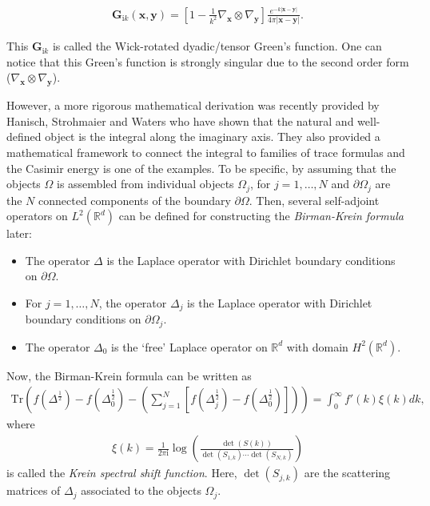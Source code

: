 \begin{align*}
    \boldsymbol{G}_{\mathrm{i}k}(\boldsymbol{x}, \boldsymbol{y}) = \left[1 - \frac{1}{k^{2}}\nabla_{\boldsymbol{x}}\otimes\nabla_{\boldsymbol{y}}\right]\frac{e^{-k|\boldsymbol{x} - \boldsymbol{y}|}}{4\pi|\boldsymbol{x} - \boldsymbol{y}|}.
\end{align*}

This $ \boldsymbol{G}_{\mathrm{i}k}$ is called the Wick-rotated dyadic/tensor Green's function. One can notice that this Green's function is strongly singular 
due to the second order form ($\nabla_{\boldsymbol{x}}\otimes\nabla_{\boldsymbol{y}}$). 



However, a more rigorous mathematical 
derivation was recently provided by Hanisch, Strohmaier and Waters \cite{hanisch2020relative} who have shown that the natural and well-defined object is the 
integral along the imaginary axis. They also provided a mathematical framework to connect the integral to families of trace formulas and the Casimir 
energy is one of the examples. To be specific, by assuming that the objects $\Omega$ is assembled from individual objects $\Omega_{j}$, for $j = 1, \dots, N$ and 
$\partial\Omega_{j}$ are the $N$ connected components of the boundary $\partial\Omega$. Then, several self-adjoint operators on $L^{2}(\mathbb{R}^{d})$
can be defined for constructing the \emph{Birman-Krein formula} later:
\begin{itemize}
    \item The operator $\Delta$ is the Laplace operator with Dirichlet boundary conditions on $\partial\Omega$.
    \item For $j = 1, \dots, N$, the operator $\Delta_{j}$ is the Laplace operator with Dirichlet boundary conditions on $\partial\Omega_{j}$.
    \item The operator $\Delta_{0}$ is the `free' Laplace operator on $\mathbb{R}^{d}$ with domain $H^{2}(\mathbb{R}^{d})$.
\end{itemize}

Now, the Birman-Krein formula can be written as 
\begin{align}\label{B-K formula}
    \text{Tr}\left(f(\Delta^{\frac{1}{2}}) - f(\Delta_{0}^{\frac{1}{2}}) - \left(\sum_{j = 1}^{N}[f(\Delta_{j}^{\frac{1}{2}}) - f(\Delta_{0}^{\frac{1}{2}})]\right)\right)  = \int_{0}^{\infty}f'(k)\xi(k)dk,
\end{align}
where 
\begin{align*}
    \xi(k) = \frac{1}{2\pi \mathrm{i}}\log\left(\frac{\det(S(k))}{\det(S_{1,k})\cdots\det(S_{N,k})}\right)
\end{align*}
is called the \emph{Krein spectral shift function}. Here, $\det(S_{j,k})$ are the scattering matrices of $\Delta_{j}$ associated to the objects $\Omega_{j}$.

